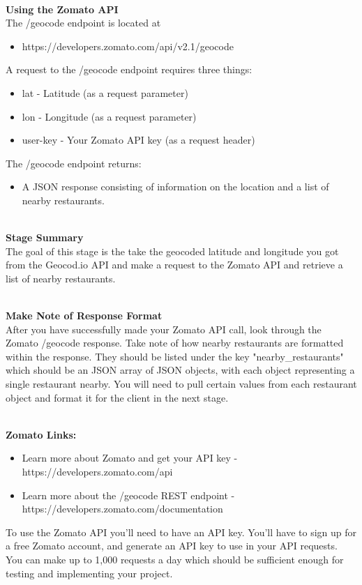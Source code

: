 \documentclass{article}
\begin{document}
\-\ \\
\textbf{Using the Zomato API} \\
The /geocode endpoint is located at
\begin{itemize}
\item https://developers.zomato.com/api/v2.1/geocode
\end{itemize}
A request to the /geocode endpoint requires three things:
\begin{itemize}
\item lat - Latitude (as a request parameter)
\item lon - Longitude (as a request parameter)
\item user-key - Your Zomato API key (as a request header)
\end{itemize}
The /geocode endpoint returns:
\begin{itemize}
\item A JSON response consisting of information on the location and a list of nearby restaurants.
\end{itemize}

\-\ \\
\textbf{Stage Summary}\\
The goal of this stage is the take the geocoded latitude and longitude you got from the Geocod.io API and make a request to the Zomato API and retrieve a list of nearby restaurants.

\-\ \\
\textbf{Make Note of Response Format}\\
After you have successfully made your Zomato API call, look through the Zomato /geocode response. Take note of how nearby restaurants are formatted within the response. They should be listed under the key "nearby\_restaurants" which should be an JSON array of JSON objects, with each object representing a single restaurant nearby. You will need to pull certain values from each restaurant object and format it for the client in the next stage. 

\-\ \\
\textbf{Zomato Links:}
\begin{itemize}
\item  Learn more about Zomato and get your API key - https://developers.zomato.com/api
\item Learn more about the /geocode REST endpoint - https://developers.zomato.com/documentation
\end{itemize}

\begin{info}
To use the Zomato API you'll need to have an API key. You'll have to sign up for a free Zomato account, and generate an API key to use in your API requests. You can make up to 1,000 requests a day which should be sufficient enough for testing and implementing your project. 
\end{info}
\end{document}
